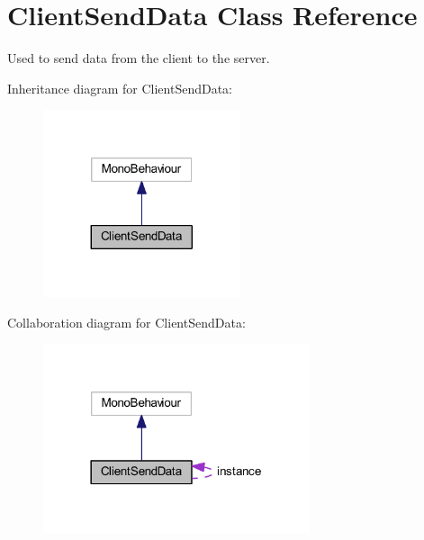 \hypertarget{class_client_send_data}{}\section{Client\+Send\+Data Class Reference}
\label{class_client_send_data}


Used to send data from the client to the server.  




Inheritance diagram for Client\+Send\+Data\+:\nopagebreak
\begin{figure}[H]
\begin{center}
\leavevmode
\includegraphics[width=164pt]{class_client_send_data__inherit__graph}
\end{center}
\end{figure}


Collaboration diagram for Client\+Send\+Data\+:\nopagebreak
\begin{figure}[H]
\begin{center}
\leavevmode
\includegraphics[width=222pt]{class_client_send_data__coll__graph}
\end{center}
\end{figure}
